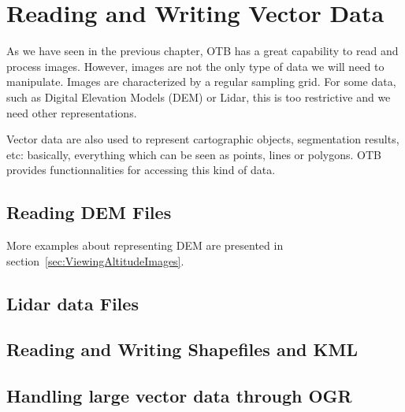 \chapter{Reading and Writing Vector Data}
\label{sec:ReadingVectorData}

As we have seen in the previous chapter, OTB has a great capability to
read and process images. However, images are not the only type of data
we will need to manipulate. Images are characterized by a regular
sampling grid. For some data, such as Digital Elevation Models (DEM)
or Lidar, this is too restrictive and we need other representations.

Vector data are also used to represent cartographic objects,
segmentation results, etc: basically, everything which can be seen as
points, lines or polygons. OTB provides functionnalities for accessing
this kind of data.

\section{Reading DEM Files}
\label{sec:ReadDEM}


More examples about representing DEM are presented in section~\ref{sec:ViewingAltitudeImages}.

\section{Lidar data Files}
\label{sec:ReadLidar}



\section{Reading and Writing Shapefiles and KML}
\label{sec:ReadVectorData}


\section{Handling large vector data through OGR}
\label{sec:OGRWrappers}


% 
